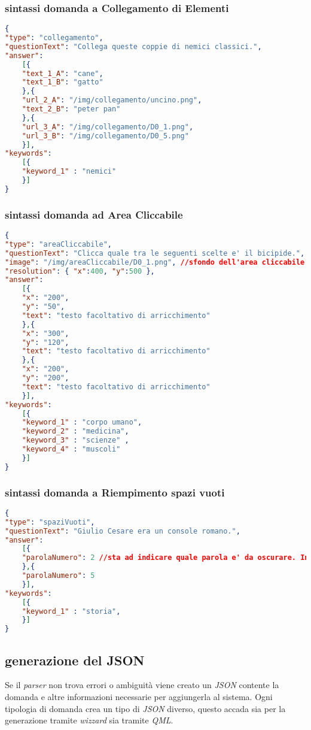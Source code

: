 \subsubsection{sintassi domanda a Collegamento di Elementi}
\begin{lstlisting}[language=json,firstnumber=1]
{
"type": "collegamento",
"questionText": "Collega queste coppie di nemici classici.",
"answer":
	[{
	"text_1_A": "cane",
	"text_1_B": "gatto"
	},{
	"url_2_A": "/img/collegamento/uncino.png",
	"text_2_B": "peter pan"
	},{
	"url_3_A": "/img/collegamento/D0_1.png",
	"url_3_B": "/img/collegamento/D0_5.png"
	}],
"keywords":
	[{
	"keyword_1" : "nemici"
	}]
}
\end{lstlisting}

\subsubsection{sintassi domanda ad Area Cliccabile}
\begin{lstlisting}[language=json,firstnumber=1]
{
"type": "areaCliccabile",
"questionText": "Clicca quale tra le seguenti scelte e' il bicipide.",
"image": "/img/areaCliccabile/D0_1.png", //sfondo dell'area cliccabile
"resolution": { "x":400, "y":500 },
"answer":
	[{
	"x": "200",
	"y": "50",
	"text": "testo facoltativo di arricchimento"
	},{
	"x": "300",
	"y": "120",
	"text": "testo facoltativo di arricchimento"
	},{
	"x": "200",
	"y": "200",
	"text": "testo facoltativo di arricchimento"
	}],
"keywords":
	[{
	"keyword_1" : "corpo umano",
	"keyword_2" : "medicina",
	"keyword_3" : "scienze" ,
	"keyword_4" : "muscoli"
	}]
}
\end{lstlisting}

\subsubsection{sintassi domanda a Riempimento spazi vuoti}
\begin{lstlisting}[language=json,firstnumber=1]
{
"type": "spaziVuoti",
"questionText": "Giulio Cesare era un console romano.",
"answer":
	[{
	"parolaNumero": 2 //sta ad indicare quale parola e' da oscurare. In questo caso la numero 2
	},{
	"parolaNumero": 5
	}],
"keywords":
	[{
	"keyword_1" : "storia",
	}] 
}
\end{lstlisting}

\subsection{generazione del JSON}
Se il \textit{parser} non trova errori o ambiguità viene creato un \textit{JSON} contente la domanda e altre informazioni necessarie per aggiungerla al sistema. Ogni tipologia di domanda crea un tipo di \textit{JSON} diverso, questo accada sia per la generazione tramite \textit{wizzard} sia tramite \textit{QML}.

